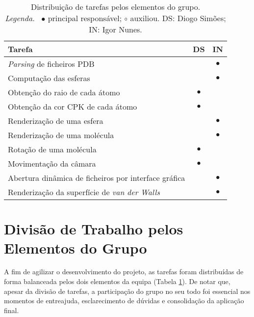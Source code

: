 \begin{table}[!htbp]
	\centering
	\begin{tabular}{l c c}
		\toprule
		\textbf{Tarefa} & \textbf{DS} & \textbf{IN} \\
		\midrule
        \textit{Parsing} de ficheiros \acs{PDB}              &  & $\bullet$ \\
        Computação das esferas                               &  & $\bullet$ \\
        Obtenção do raio de cada átomo                       & $\bullet$ &  \\
        Obtenção da cor CPK de cada átomo                    & $\bullet$ &  \\
        Renderização de uma esfera                           &  & $\bullet$ \\
        Renderização de uma molécula                         &  & $\bullet$ \\
        Rotação de uma molécula                              & $\bullet$ &  \\
        Movimentação da câmara                               & $\bullet$ &  \\
        Abertura dinâmica de ficheiros por interface gráfica &  & $\bullet$ \\
        Renderização da superfície de \textit{van der Walls} &  & $\bullet$ \\
		\bottomrule
	\end{tabular}
	\caption[Distribuição de tarefas]{
		Distribuição de tarefas pelos elementos do grupo.\\
		\textit{Legenda.}~%
		$\bullet$ principal responsável; $\circ$ auxiliou.
		DS: Diogo Simões; IN: Igor Nunes.
	}
	\label{tab::divisao-trabalho}
\end{table}


\section{Divisão de Trabalho pelos Elementos do Grupo}
\label{sec::reflexao:divisao}

A fim de agilizar o desenvolvimento do projeto, as tarefas foram distribuídas de forma balanceada pelos dois elementos da equipa (Tabela \ref{tab::divisao-trabalho}). De notar que, apesar da divisão de tarefas, a participação do grupo no seu todo foi essencial nos momentos de entreajuda, esclarecimento de dúvidas e consolidação da aplicação final.




